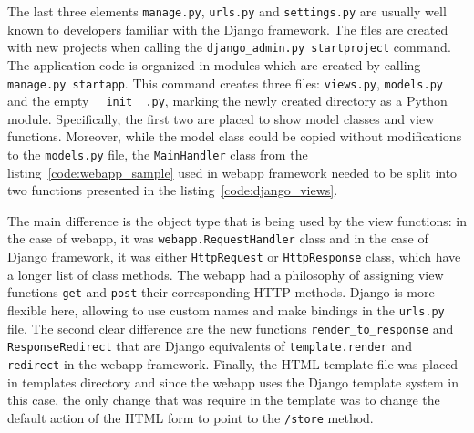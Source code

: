 The last three elements \texttt{manage.py}, \texttt{urls.py} and \texttt{settings.py} are usually well known to developers familiar with the Django framework. The files are created with new projects when calling the \texttt{django\_admin.py startproject} command. The application code is organized in modules which are created by calling \texttt{manage.py startapp}. This command creates three files: \texttt{views.py}, \texttt{models.py} and the empty \texttt{\_\_init\_\_.py}, marking the newly created directory as a Python module. Specifically, the first two are placed to show model classes and view functions. Moreover, while the model class could be copied without modifications to the \texttt{models.py} file, the \texttt{MainHandler} class from the listing~\ref{code:webapp_sample} used in webapp framework needed to be split into two functions presented in the listing~\ref{code:django_views}.

The main difference is the object type that is being used by the view functions: in the case of webapp, it was \texttt{webapp.RequestHandler} class and in the case of Django framework, it was either \texttt{HttpRequest} or \texttt{HttpResponse} class, which have a longer list of class methods. The webapp had a philosophy of assigning view functions \texttt{get} and \texttt{post} their corresponding HTTP methods. Django is more flexible here, allowing to use custom names and make bindings in the \texttt{urls.py} file. The second clear difference are the new functions \texttt{render\_to\_response} and \linebreak \texttt{ResponseRedirect} that are Django equivalents of \texttt{template.render} and \texttt{redirect} in the webapp framework. Finally, the HTML template file  was placed in templates directory and since the webapp uses the Django template system in this case, the only change that was require in the template was to change the default action of the HTML form to point to the \texttt{/store} method.

